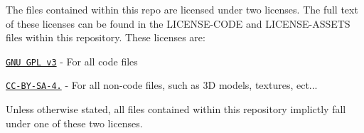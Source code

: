 The files contained within this repo are licensed under two licenses. The full text of these licenses can be found in the L\+I\+C\+E\+N\+S\+E-\/\+C\+O\+DE and L\+I\+C\+E\+N\+S\+E-\/\+A\+S\+S\+E\+TS files within this repository. These licenses are\+:
\begin{DoxyItemize}
\item \href{https://choosealicense.com/licenses/gpl-3.0/}{\tt G\+NU G\+PL v3} -\/ For all code files
\item \href{https://choosealicense.com/licenses/cc-by-sa-4.0/}{\tt C\+C-\/\+B\+Y-\/\+S\+A-\/4.} -\/ For all non-\/code files, such as 3D models, textures, ect...
\end{DoxyItemize}

Unless otherwise stated, all files contained within this repository implictly fall under one of these two licenses. 